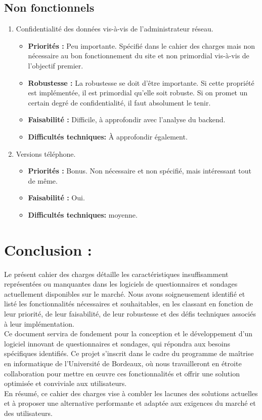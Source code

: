 \documentclass{article}
\begin{document}
\subsection{Non fonctionnels}
\begin{enumerate}[noitemsep]
\item Confidentialité des données vis-à-vis de l'administrateur réseau.
\begin{itemize}[noitemsep]
\item \textbf{Priorités : }Peu importante. Spécifié dans le cahier des charges mais non nécessaire au bon fonctionnement du site et non primordial vis-à-vis de l'objectif premier.
\item \textbf{Robustesse : } La robustesse se doit d'être importante. Si cette propriété est implémentée, il est primordial qu'elle soit robuste. Si on promet un certain degré de confidentialité, il faut absolument le tenir.
\item \textbf{Faisabilité : } Difficile, à approfondir avec l'analyse du backend.
\item \textbf{Difficultés techniques: } À approfondir également.
\end{itemize}

\item Versions téléphone.
\begin{itemize}[noitemsep]
\item \textbf{Priorités : }Bonus. Non nécessaire et non spécifié, mais intéressant tout de même.
\item \textbf{Faisabilité : } Oui.
\item \textbf{Difficultés techniques: } moyenne.
\end{itemize}
\end{enumerate}


\section{Conclusion :}

Le présent cahier des charges détaille les caractéristiques insuffisamment représentées ou manquantes dans les logiciels de questionnaires et sondages actuellement disponibles sur le marché. Nous avons soigneusement identifié et listé les fonctionnalités nécessaires et souhaitables, en les classant en fonction de leur priorité, de leur faisabilité, de leur robustesse et des défis techniques associés à leur implémentation.\\

Ce document servira de fondement pour la conception et le développement d'un logiciel innovant de questionnaires et sondages, qui répondra aux besoins spécifiques identifiés. Ce projet s'inscrit dans le cadre du programme de maîtrise en informatique de l'Université de Bordeaux, où nous travailleront en étroite collaboration pour mettre en œuvre ces fonctionnalités et offrir une solution optimisée et conviviale aux utilisateurs.\\

En résumé, ce cahier des charges vise à combler les lacunes des solutions actuelles et à proposer une alternative performante et adaptée aux exigences du marché et des utilisateurs.
\end{document}
